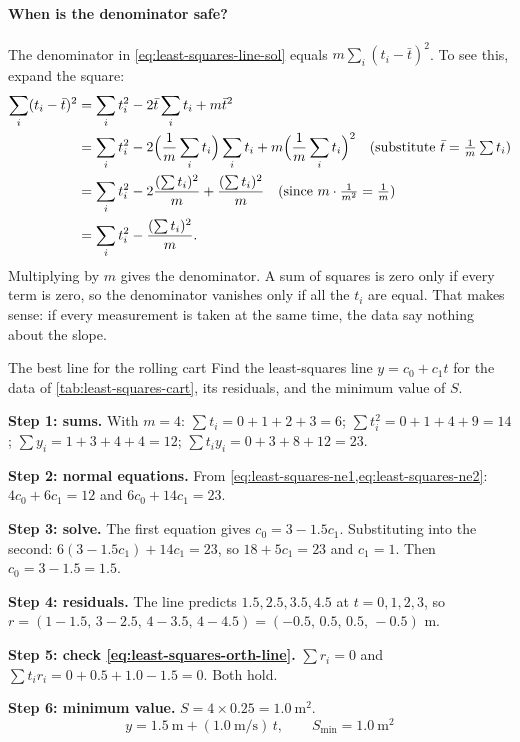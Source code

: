 \paragraph{When is the denominator safe?} The denominator in \cref{eq:least-squares-line-sol} equals $m\sum_i (t_i-\bar t)^2$. To see this, expand the square:
\begin{align*}
\sum_i (t_i - \bar t)^2 &= \sum_i t_i^2 - 2\bar t\sum_i t_i + m\bar t^2 \\
&= \sum_i t_i^2 - 2\Bigl(\frac1m\sum_i t_i\Bigr)\sum_i t_i + m\Bigl(\frac1m\sum_i t_i\Bigr)^2 \quad\text{(substitute } \bar t = \textstyle\frac1m\sum t_i)\\
&= \sum_i t_i^2 - 2\frac{(\sum t_i)^2}{m} + \frac{(\sum t_i)^2}{m} \quad\text{(since } m\cdot\tfrac{1}{m^2} = \tfrac1m)\\
&= \sum_i t_i^2 - \frac{(\sum t_i)^2}{m}.
\end{align*}
Multiplying by $m$ gives the denominator. A sum of squares is zero only if every term is zero, so the denominator vanishes only if all the $t_i$ are equal. That makes sense: if every measurement is taken at the same time, the data say nothing about the slope.

\begin{sample}{The best line for the rolling cart}
Find the least-squares line $y = c_0 + c_1 t$ for the data of \cref{tab:least-squares-cart}, its residuals, and the minimum value of $S$.

\textbf{Step 1: sums.} With $m=4$: $\sum t_i = 0+1+2+3 = 6$; $\sum t_i^2 = 0+1+4+9 = 14$; $\sum y_i = 1+3+4+4 = 12$; $\sum t_i y_i = 0+3+8+12 = 23$.

\textbf{Step 2: normal equations.} From \cref{eq:least-squares-ne1,eq:least-squares-ne2}:
$4c_0 + 6c_1 = 12$ and $6c_0 + 14 c_1 = 23$.

\textbf{Step 3: solve.} The first equation gives $c_0 = 3 - 1.5c_1$. Substituting into the second: $6(3-1.5c_1) + 14c_1 = 23$, so $18 + 5c_1 = 23$ and $c_1 = 1$. Then $c_0 = 3-1.5 = 1.5$.

\textbf{Step 4: residuals.} The line predicts $1.5, 2.5, 3.5, 4.5$ at $t=0,1,2,3$, so $r = (1-1.5,\,3-2.5,\,4-3.5,\,4-4.5) = (-0.5,\,0.5,\,0.5,\,-0.5)$ m.

\textbf{Step 5: check \cref{eq:least-squares-orth-line}.} $\sum r_i = 0$ and $\sum t_i r_i = 0 + 0.5 + 1.0 - 1.5 = 0$. Both hold.

\textbf{Step 6: minimum value.} $S = 4\times 0.25 = 1.0\ \mathrm{m}^2$.
\[
\boxed{\,y = 1.5\ \mathrm{m} + (1.0\ \mathrm{m/s})\,t,\qquad S_{\min} = 1.0\ \mathrm{m}^2\,}
\]
\end{sample}

